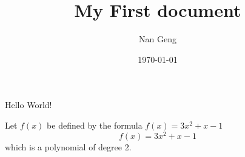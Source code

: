 \documentclass{article} %
\title{My First document}
\author{Nan Geng}
\date{\today}
\begin{document}
\maketitle
Hello World!

Let $f(x)$ be defined by the formula $f(x)=3x^2+x-1$
$$f(x)=3x^2+x-1$$ which is a polynomial of degree 2.
\end{document}
